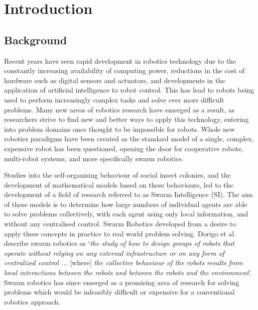 
\chapter[Introduction]{Introduction} %

\label{Chapter1} %


\newcommand{\keyword}[1]{\textbf{#1}}
\newcommand{\tabhead}[1]{\textbf{#1}}
\newcommand{\code}[1]{\texttt{#1}}
\newcommand{\file}[1]{\texttt{\bfseries#1}}
\newcommand{\option}[1]{\texttt{\itshape#1}}


\section{Background}
Recent years have seen rapid development in robotics technology due to the constantly increasing availability of computing power, reductions in the cost of hardware such as digital sensors and actuators, and developments in the application of artificial intelligence to robot control. This has lead to robots being used to perform increasingly complex tasks and solve ever more difficult problems. Many new areas of robotics research have emerged as a result, as researchers strive to find new and better ways to apply this technology, entering into problem domains once thought to be impossible for robots. Whole new robotics paradigms have been created as the standard model of a single, complex, expensive robot has been questioned, opening the door for cooperative robots, multi-robot systems, and more specifically swarm robotics.

Studies into the self-organising behaviour of social insect colonies, and the development of mathematical models based on these behaviours, led to the development of a field of research referred to as Swarm Intelligence (SI). The aim of these models is to determine how large numbers of individual agents are able to solve problems collectively, with each agent using only local information, and without any centralised control. Swarm Robotics developed from a desire to apply these concepts in practice to real world problem solving. Dorigo et al. describe swarm robotics as `\textit{the study of how to design groups of robots that operate without relying on any external infrastructure or on any form of centralized control ... }[where]\textit{ the collective behaviour of the robots results from local interactions between the robots and between the robots and the environment}\cite{Dorigo:2014}'. Swarm robotics has since emerged as a promising area of research for solving problems which would be infeasibly difficult or expensive for a conventional robotics approach.

